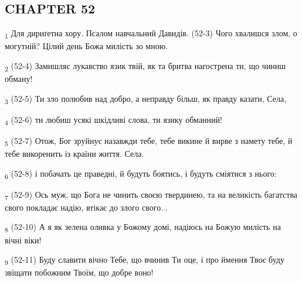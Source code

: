 \subsection{CHAPTER 52}
\begin{tcolorbox}
\textsubscript{1} Для дириґетна хору. Псалом навчальний Давидів. (52-3) Чого хвалишся злом, о могутній? Цілий день Божа милість зо мною.
\end{tcolorbox}
\begin{tcolorbox}
\textsubscript{2} (52-4) Замишляє лукавство язик твій, як та бритва нагострена ти, що чиниш обману!
\end{tcolorbox}
\begin{tcolorbox}
\textsubscript{3} (52-5) Ти зло полюбив над добро, а неправду більш, як правду казати, Села,
\end{tcolorbox}
\begin{tcolorbox}
\textsubscript{4} (52-6) ти любиш усякі шкідливі слова, ти язику обманний!
\end{tcolorbox}
\begin{tcolorbox}
\textsubscript{5} (52-7) Отож, Бог зруйнує назавжди тебе, тебе викине й вирве з намету тебе, й тебе викоренить із країни життя. Села.
\end{tcolorbox}
\begin{tcolorbox}
\textsubscript{6} (52-8) і побачать це праведні, й будуть боятись, і будуть сміятися з нього:
\end{tcolorbox}
\begin{tcolorbox}
\textsubscript{7} (52-9) Ось муж, що Бога не чинить своєю твердинею, та на великість багатства свого покладає надію, втікає до злого свого...
\end{tcolorbox}
\begin{tcolorbox}
\textsubscript{8} (52-10) А я як зелена оливка у Божому домі, надіюсь на Божую милість на вічні віки!
\end{tcolorbox}
\begin{tcolorbox}
\textsubscript{9} (52-11) Буду славити вічно Тебе, що вчинив Ти оце, і про ймення Твоє буду звіщати побожним Твоїм, що добре воно!
\end{tcolorbox}
